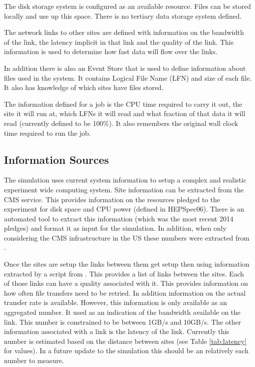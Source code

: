 \documentclass[a4paper]{jpconf}
\begin{document}
The disk storage system is configured as an available resource. Files
can be stored locally and use up this space. There is no tertiary data
storage system defined.

The network links to other sites are defined with information on the
bandwidth of the link, the latency implicit in that link and the quality
of the link. This information is used to determine how fast data will
flow over the links.

In addition there is also an Event Store that is used to define
information about files used in the system. It contains Logical File
Name (LFN) and size of each file. It also has knowledge of which sites
have files stored.

The information defined for a job is the CPU time required to carry it
out, the site it will run at, which LFNs it will read and what
fraction of that data it will read (currently defined to be 100\%). It
also remembers the original wall clock time required to run the job.

\subsection{Information Sources}

The simulation uses current system information to setup a complex and
realistic experiment wide computing system. Site information can be
extracted from the CMS
service. This provides information on the resources pledged to the
experiment for disk space and CPU power (defined in HEPSpec06). There
is an automated tool to extract this information (which was the most
recent 2014 pledges) and format it as input for the simulation. In
addition, when only considering the CMS infrastructure in the US these
numbers were extracted from
.

Once the sites are setup the links between them get setup then using
information extracted by a script from
. This
provides a list of links between the sites. Each of those links can
have a quality associated with it. This provides information on how
often file transfers need to be retried. In addition information on
the actual transfer rate is available. However, this information is
only available as an aggregated number. It used as an indication of the
bandwidth available on the link. This number is constrained to be
between 1GB/s and 10GB/s. The other information associated with a link
is the latency of the link. Currently this number is estimated based
on the distance between sites (see Table \ref{tab:latency} for
values). In a future update to the simulation this should be an
relatively each number to measure.
\end{document}
